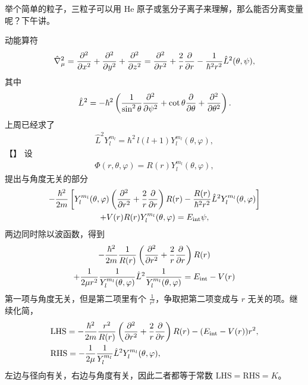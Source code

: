 举个简单的粒子，三粒子可以用 He 原子或氢分子离子来理解，那么能否分离变量呢？下午讲。

动能算符
\begin{align}
     \hat \nabla ^2 _\mu = \pdv[2]x + \pdv[2]y + \pdv[2]z = \pdv[2]r + \frac2r \pdv{r} - \frac1{\hbar^2r^2} \hat L^2 (\theta, \psi), 
\end{align}
其中
\begin{align}
    \hat L^2 = -\hbar^2 \left(
        \frac1{\sin^2\theta} \pdv[2]{\psi} + \cot\theta \pdv{\theta} + \pdv[2]\theta
    \right). 
\end{align}
上周已经求了
\begin{align}
    \hat L^2 Y_l^{m_l} = \hbar^2 \,l(l+1) Y_l^{m_l}(\theta,\varphi), 
\end{align}
【】
设
\begin{align}
    \Phi(r,\theta,\varphi) = R(r) Y_l^{m_l} (\theta,\varphi),
\end{align}
提出与角度无关的部分
\begin{multline}
    -\frac{\hbar^2}{2m} 
    \left[
    Y_l^{m_l} (\theta,\varphi) \left(\pdv[2]r + \frac2r \pdv{r}\right) R(r) - \frac{R(r)}{\hbar^2r^2} \hat L^2 Y_l^{m_l} (\theta,\varphi)
    \right] \\
    + V(r) R(r) Y_l^{m_l} (\theta, \varphi) = E_{\mathrm {int}}\psi,
\end{multline}
两边同时除以波函数，得到
\begin{multline}
    -\frac{\hbar^2}{2m} \frac1{R(r)} 
    \left(\pdv[2]r + \frac2r \pdv{r}\right) R(r)  \\ + \frac1{2\mu r^2} \frac1{Y_l^{m_l}(\theta,\varphi)} \hat L^2 \frac1{Y_l^{m_l}(\theta,\varphi)}  = E_{\mathrm{int}} - V(r)
\end{multline}
第一项与角度无关，但是第二项里有个 $\frac1{r^2}$，争取把第二项变成与 $r$ 无关的项。继续化简，
\begin{align}
    &\text{LHS} = -\frac{\hbar^2}{2m} \frac{r^2}{R(r)} 
    \left(\pdv[2]r + \frac2r \pdv{r}\right) R(r) - (E_{\mathrm{int}} - V(r)) r^2, \\
    &\text{RHS} = -\frac1{2\mu} \frac1{Y_l^{m_l}} \hat L^2 Y_l^{m_l}(\theta,\varphi),
\end{align}
左边与径向有关，右边与角度有关，因此二者都等于常数 $\text{LHS} = \text{RHS} = K$。

